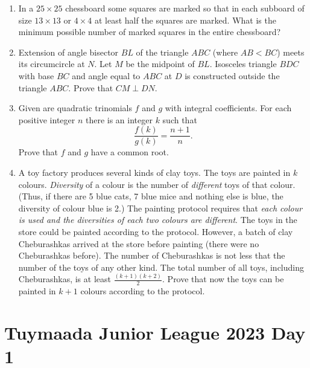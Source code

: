 \documentclass[12pt]{scrartcl}
\begin{document}
\begin{enumerate}[resume]
    \item In a $25 \times 25$ chessboard some squares are marked so that in each subboard of size $13 \times 13$ or $4 \times 4$ at least half the squares are marked. What is the minimum possible number of marked squares in the entire chessboard? 

    \item Extension of angle bisector $BL$ of the triangle $ABC$ (where $AB < BC$) meets its circumcircle at $N$. Let $M$ be the midpoint of $BL$. Isosceles triangle $BDC$ with base $BC$ and angle equal to $ABC$ at $D$ is constructed outside the triangle $ABC$. Prove that $CM \perp DN$. 

    \item Given are quadratic trinomials $f$ and $g$ with integral coefficients. For each positive integer $n$ there is an integer $k$ such that
    \[ \frac{f(k)}{g(k)} = \frac{n + 1}{n}. \]
    Prove that $f$ and $g$ have a common root. 

    \item A toy factory produces several kinds of clay toys. The toys are painted in $k$ colours. \textit{Diversity} of a colour is the number of \textit{different} toys of that colour. (Thus, if there are 5 blue cats, 7 blue mice and nothing else is blue, the diversity of colour blue is 2.) The painting protocol requires that \textit{each colour is used and the diversities of each two colours are different}. The toys in the store could be painted according to the protocol. However, a batch of clay Cheburashkas arrived at the store before painting (there were no Cheburashkas before). The number of Cheburashkas is not less that the number of the toys of any other kind. The total number of all toys, including Cheburashkas, is at least $\frac{(k+1)(k+2)}{2}$. Prove that now the toys can be painted in $k + 1$ colours according to the protocol. 
\end{enumerate}

\section{Tuymaada Junior League 2023 Day 1}
\end{document}
